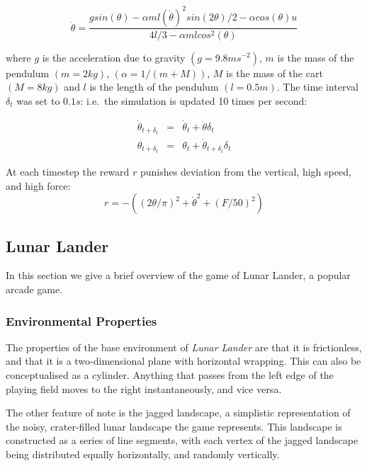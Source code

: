 \documentclass[conference]{IEEEtran}
\begin{document}
\begin{equation}
\ddot{\theta} = \frac{g sin(\theta) - \alpha m l (\dot{\theta})^2 sin(2 \theta) / 2 - \alpha cos(\theta) u}
                     {4l/3 - \alpha m l  cos^2(\theta)}
\end{equation}

where $g$ is the acceleration due to gravity
$(g = 9.8ms^{-2})$,
$m$ is the mass of the pendulum
$(m = 2kg)$, $(\alpha = 1 / (m + M))$, $M$ is the mass of the cart
$(M = 8kg)$ and $l$ is the length of the pendulum $(l = 0.5m)$.
The time interval $\delta_t$ was set to $0.1s$: i.e.\ the simulation is
updated 10 times per second:

\begin{eqnarray}
\dot{\theta}_{t+\delta_t} & = &  \dot{\theta}_{t} + \ddot{\theta} \delta_t \\
\theta_{t+\delta_t}  & = & \theta_{t} + \dot{\theta}_{t+\delta_t} \delta_t
\end{eqnarray}

At each timestep the reward $r$ punishes deviation from the vertical, high speed, and high force:
\begin{equation}
r = -((2 \theta / \pi)^2 + \dot{\theta}^2 + (F / 50)^2 )
\label{eq:rew:t}
\end{equation}


\subsection{Lunar Lander}
In this section we give a brief overview of the game of Lunar Lander, a popular arcade game. 

\subsubsection{Environmental Properties}

The properties of the base environment of {\itshape Lunar Lander} are that it is frictionless, and that it is a two-dimensional plane with horizontal wrapping. This can also be conceptualised as a cylinder. Anything that passes from the left edge of the playing field moves to the right instantaneously, and vice versa.

The other feature of note is the jagged landscape, a simplistic representation of the noisy, crater-filled lunar landscape the game represents. This landscape is constructed as a series of line segments, with each vertex of the jagged landscape being distributed equally horizontally, and randomly vertically. %
\end{document}
